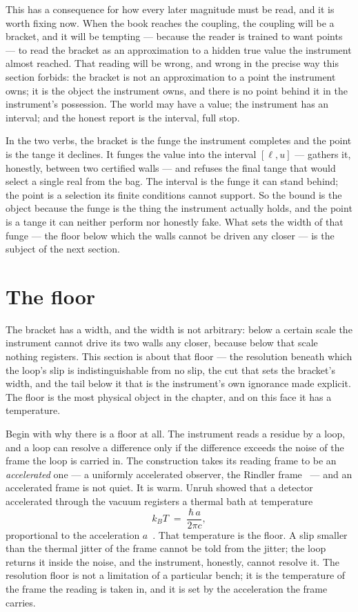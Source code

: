 This has a consequence for how every later magnitude must be read, and it is worth fixing now. When the book reaches the
coupling, the coupling will be a bracket, and it will be tempting --- because the reader is trained to want points --- to
read the bracket as an approximation to a hidden true value the instrument almost reached. That reading will be wrong, and
wrong in the precise way this section forbids: the bracket is not an approximation to a point the instrument owns; it is the
object the instrument owns, and there is no point behind it in the instrument's possession. The world may have a value; the
instrument has an interval; and the honest report is the interval, full stop.

In the two verbs, the bracket is the funge the instrument completes and the point is the tange it declines. It funges the
value into the interval $[\ell, u]$ --- gathers it, honestly, between two certified walls --- and refuses the final tange
that would select a single real from the bag. The interval is the funge it can stand behind; the point is a selection its
finite conditions cannot support. So the bound is the object because the funge is the thing the instrument actually holds,
and the point is a tange it can neither perform nor honestly fake. What sets the width of that funge --- the floor below
which the walls cannot be driven any closer --- is the subject of the next section.

\section{The floor}

The bracket has a width, and the width is not arbitrary: below a certain scale the instrument cannot drive its two walls any
closer, because below that scale nothing registers. This section is about that floor --- the resolution beneath which the
loop's slip is indistinguishable from no slip, the cut that sets the bracket's width, and the tail below it that is the
instrument's own ignorance made explicit. The floor is the most physical object in the chapter, and on this face it has a
temperature.

Begin with why there is a floor at all. The instrument reads a residue by a loop, and a loop can resolve a difference only
if the difference exceeds the noise of the frame the loop is carried in. The construction takes its reading frame to be an
\emph{accelerated} one --- a uniformly accelerated observer, the Rindler frame~\cite{rindler2006} --- and an accelerated
frame is not quiet. It is warm. Unruh showed that a detector accelerated through the vacuum registers a thermal bath at
temperature
\[
  k_B T \;=\; \frac{\hbar\,a}{2\pi c},
\]
proportional to the acceleration $a$~\cite{unruh1976}. That temperature is the floor. A slip smaller than the thermal jitter
of the frame cannot be told from the jitter; the loop returns it inside the noise, and the instrument, honestly, cannot
resolve it. The resolution floor is not a limitation of a particular bench; it is the temperature of the frame the reading is
taken in, and it is set by the acceleration the frame carries.

